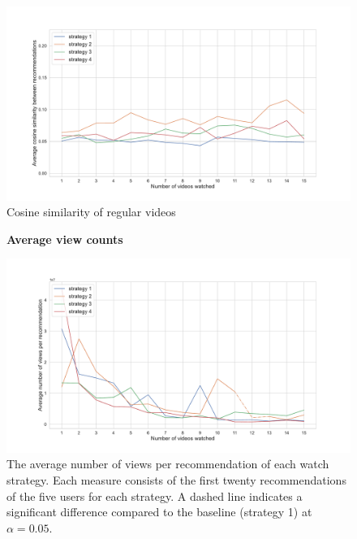 \begin{appendices}
\begin{figure}
\centering
\includegraphics[width=\textwidth]{images/Reg sim.pdf}
\caption{Cosine similarity of regular videos}
\label{appendix:reg_sim}
\end{figure}

\begin{figure}
  \textbf{Average view counts}\par\medskip
  \centering
  \includegraphics[keepaspectratio, width=\textwidth]{images/views.pdf}
  \caption{The average number of views per recommendation of each watch strategy. Each measure consists of the first twenty recommendations of the five users for each strategy. A dashed line indicates a significant difference compared to the baseline (strategy 1) at $\alpha = 0.05$.}
  \label{appendix:views}
\end{figure}



\end{appendices}

